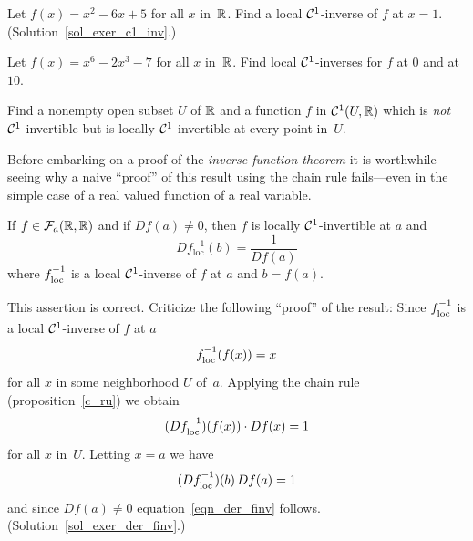\begin{exer}\label{exer_c1_inv}  Let $f(x) = x^2 - 6x + 5$  for all $x$ in~$\mathbb{R}$.  Find a local
$\mathcal{C}^1$-inverse of $f$ at $x = 1$. (Solution~\ref{sol_exer_c1_inv}.)
\end{exer}

\begin{prob}  Let $f(x) = x^6 - 2x^3 -7$ for all $x$ in~$\mathbb{R}$.  Find local $\mathcal{C}^1$-inverses
for $f$ at $0$ and at~$10$.
\end{prob}

\begin{prob}  Find a nonempty open subset $U$ of $\mathbb{R}$ and a function $f$ in $\mathcal{C}^1(U,\mathbb{R})$
which is \emph{not} $\mathcal{C}^1$-invertible but is locally $\mathcal{C}^1$-invertible at every point
in~$U$.
\end{prob}

Before embarking on a proof of the \emph{inverse function theorem} it is worthwhile seeing why
a naive ``proof'' of this result using the chain rule fails---even in the simple case of a
real valued function of a real variable.

\begin{exer}\label{exer_der_finv}  If $f \in \mathcal{F}_a(\mathbb{R},\mathbb{R})$ and if $Df(a) \ne 0$, then $f$
is locally $\mathcal{C}^1$-invertible at $a$ and
  \begin{equation}\label{eqn_der_finv}
      Df^{-1}_{\text{loc}}(b) = \frac1{Df(a)}
  \end{equation}
where $f_{\mathstrut\text{loc}}^{\mathstrut{-1}}$ is a local $\mathcal{C}^1$-inverse of $f$ at $a$ and $b = f(a)$.

This assertion is correct.  Criticize the following ``proof'' of the result:  Since $f_{\mathstrut\text{loc}}^{\mathstrut{-1}}$ is a local $\mathcal{C}^1$-inverse of $f$ at $a$
  \[ f_{\mathstrut\text{loc}}^{\mathstrut{-1}}(f(x)) = x \]
for all $x$ in some neighborhood $U$ of~$a$.  Applying the chain rule (proposition~\ref{c_ru})
we obtain
  \[ (Df_{\mathstrut\text{loc}}^{\mathstrut{-1}})(f(x)) \cdot Df(x)  =  1 \]
for all $x$ in~$U$.  Letting $x = a$ we have
  \[ (Df_{\mathstrut\text{loc}}^{\mathstrut{-1}})(b)\,Df(a)  =  1 \]
and since $Df(a) \ne 0$  equation~\eqref{eqn_der_finv} follows.
(Solution~\ref{sol_exer_der_finv}.)
\end{exer}

